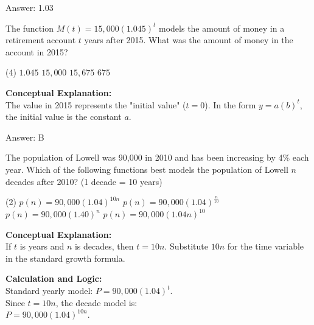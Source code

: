 \documentclass[11pt,paper=a4,answers]{exam}
\begin{document}
\begin{questions}
\begin{solution}
\vspace{25pt}

Answer: \colorbox{yellow!100}{1.03}
\end{solution}

\vspace{40pt}

\question
The function $M(t) = 15,000(1.045)^t$ models the amount of money in a retirement account $t$ years after 2015. What was the amount of money in the account in 2015?
\begin{tasks}(4)
    \task $1.045$
    \task $15,000$
    \task $15,675$
    \task $675$
\end{tasks}

\begin{solution}
\textbf{Conceptual Explanation:} \\
The value in 2015 represents the "initial value" ($t = 0$). In the form $y = a(b)^t$, the initial value is the constant $a$.

\vspace{25pt}

Answer: \colorbox{yellow!100}{B}
\end{solution}

\vspace{40pt}

\question
The population of Lowell was 90,000 in 2010 and has been increasing by 4\% each year. Which of the following functions best models the population of Lowell $n$ decades after 2010? (1 decade = 10 years)
\begin{tasks}(2)
    \task $p(n) = 90,000(1.04)^{10n}$
    \task $p(n) = 90,000(1.04)^{\frac{n}{10}}$
    \task $p(n) = 90,000(1.40)^n$
    \task $p(n) = 90,000(1.04n)^{10}$
\end{tasks}

\begin{solution}
\textbf{Conceptual Explanation:} \\
If $t$ is years and $n$ is decades, then $t = 10n$. Substitute $10n$ for the time variable in the standard growth formula.

\vspace{20pt}

\textbf{Calculation and Logic:} \\
Standard yearly model: $P = 90,000(1.04)^t$. \\
Since $t = 10n$, the decade model is: \\
$P = 90,000(1.04)^{10n}$.


\end{solution}
\end{questions}
\end{document}
